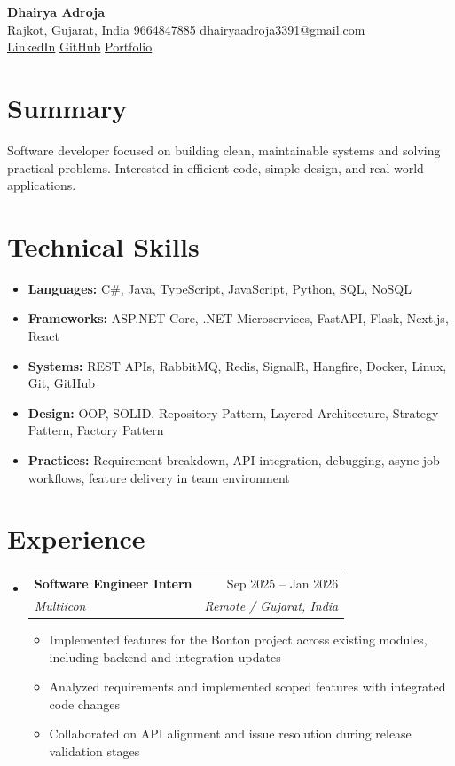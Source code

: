 \documentclass[11pt,a4paper]{article}
\makeatletter
\newcommand{\resumeSubheading}[4]{
  \vspace{-1pt}\item
    \begin{tabular*}{0.97\textwidth}[t]{l@{\extracolsep{\fill}}r}
      \textbf{#1} & #2 \\
      \textit{#3} & \textit{#4} \\
    \end{tabular*}\vspace{-3pt}
}
\newcommand{\resumeItem}[1]{
  \item\small{#1 \vspace{-1pt}}
}
\makeatother
\begin{document}
\begin{center}
    {\huge \textbf{Dhairya Adroja}} \\
    \vspace{8pt}
    \small Rajkot, Gujarat, India \textbar{} 9664847885 \textbar{} dhairyaadroja3391@gmail.com \\
    \small
    \href{https://www.linkedin.com/in/adrojadhairya}{LinkedIn} \textbar{}
    \href{https://www.github.com/Dhairya3391}{GitHub} \textbar{}
    \href{https://dhairya.codes}{Portfolio}
\end{center}

\section{Summary}
\noindent Software developer focused on building clean, maintainable systems and solving practical problems. Interested in efficient code, simple design, and real-world applications.

\section{Technical Skills}
\begin{itemize}[leftmargin=*]
  \resumeItem{\textbf{Languages:} C\#, Java, TypeScript, JavaScript, Python, SQL, NoSQL}
  \resumeItem{\textbf{Frameworks:} ASP.NET Core, .NET Microservices, FastAPI, Flask, Next.js, React}
  \resumeItem{\textbf{Systems:} REST APIs, RabbitMQ, Redis, SignalR, Hangfire, Docker, Linux, Git, GitHub}
  \resumeItem{\textbf{Design:} OOP, SOLID, Repository Pattern, Layered Architecture, Strategy Pattern, Factory Pattern}
  \resumeItem{\textbf{Practices:} Requirement breakdown, API integration, debugging, async job workflows, feature delivery in team environment}
\end{itemize}

\section{Experience}
\begin{itemize}[leftmargin=*]
\resumeSubheading
{Software Engineer Intern}{Sep 2025 -- Jan 2026}
{Multiicon}{Remote / Gujarat, India}
\begin{itemize}[leftmargin=*]
  \resumeItem{Implemented features for the Bonton project across existing modules, including backend and integration updates}
  \resumeItem{Analyzed requirements and implemented scoped features with integrated code changes}
  \resumeItem{Collaborated on API alignment and issue resolution during release validation stages}
\end{itemize}
\end{itemize}
\end{document}
